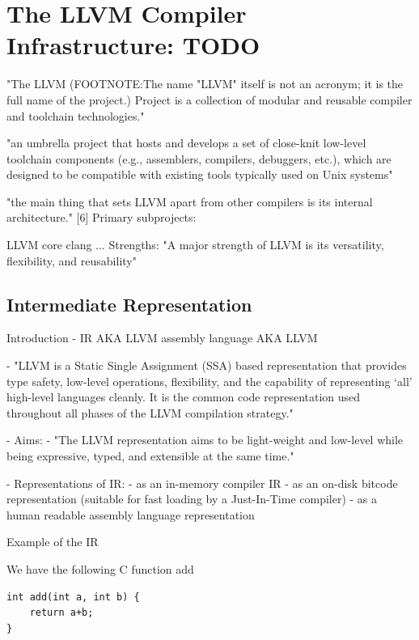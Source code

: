 \documentclass[12pt, twoside]{fithesis2}
\renewcommand{\_}{\leavevmode \kern0.07em\vbox{\hrule width0.4em}}
\begin{document}
\chapter{The LLVM Compiler Infrastructure: TODO}
\label{chap:llvm}

"The LLVM (FOOTNOTE:The name "LLVM" itself is not an acronym; it is the full
name of the project.) Project is a collection of modular and reusable compiler
and toolchain technologies." \cite{llvm}

"an umbrella project that hosts and develops a set of close-knit low-level
toolchain components (e.g., assemblers, compilers, debuggers, etc.), which are
designed to be compatible with existing tools typically used on Unix systems"

"the main thing that sets LLVM apart from other compilers is its internal
architecture." [6] Primary subprojects:

LLVM core clang ...  Strengths: "A major strength of LLVM is its versatility,
flexibility, and reusability"

\section{Intermediate Representation}
\label{sec:llvm-ir}

Introduction
- IR AKA LLVM assembly language AKA LLVM

- "LLVM is a Static Single Assignment (SSA) based representation that provides
type safety, low-level operations, flexibility, and the capability of
representing ‘all’ high-level languages cleanly. It is the common code
representation used throughout all phases of the LLVM compilation strategy."

- Aims:
 - "The LLVM representation aims to be light-weight and low-level while being
 expressive, typed, and extensible at the same time."

- Representations of IR:
 - as an in-memory compiler IR
 - as an on-disk bitcode representation (suitable for fast loading by a
 Just-In-Time compiler)
 - as a human readable assembly language representation

Example of the IR

We have the following C function add

\begin{verbatim}
int add(int a, int b) {
    return a+b;
}
\end{verbatim}
\end{document}
